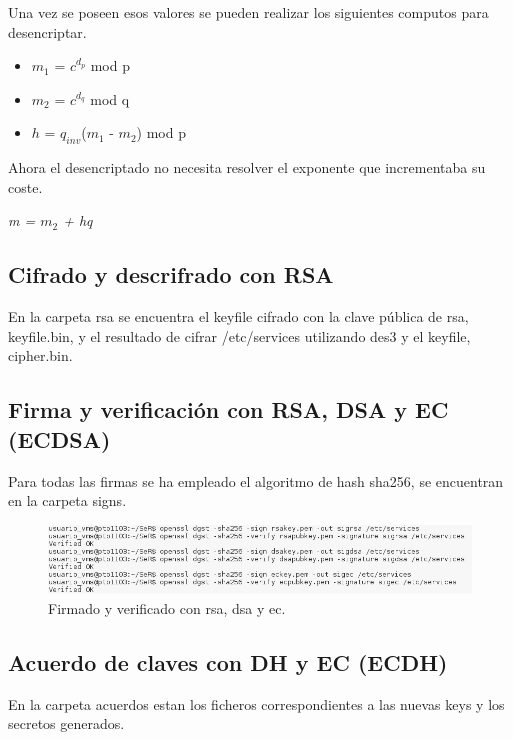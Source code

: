 \documentclass[11pt]{article}
\begin{document}
      \par
      Una vez se poseen esos valores se pueden realizar los siguientes computos para desencriptar.
      \begin{itemize}
        \item $m_1$ = $c^{d_p}$ mod p
        \item $m_2$ = $c^{d_q}$ mod q
        \item $h$ = $q_{inv}$($m_1$ - $m_2$) mod p
      \end{itemize}

      \par
      Ahora el desencriptado no necesita resolver el exponente que incrementaba su coste.
      \begin{center}
        \Large
        \textit{m = $m_2$ + hq}
      \end{center}

    \subsection{Cifrado y descrifrado con RSA}
      \par
      En la carpeta rsa se encuentra el keyfile cifrado con la clave pública de rsa, keyfile.bin,
      y el resultado de cifrar /etc/services utilizando des3 y el keyfile, cipher.bin.

    \subsection{Firma y verificación con RSA, DSA y EC (ECDSA)}
      \par
      Para todas las firmas se ha empleado el algoritmo de hash sha256, se encuentran en la carpeta
      signs.

      \FloatBarrier
      \begin{figure}[H]
        \centering
        \includegraphics[width = \textwidth]{signs}
        \caption{Firmado y verificado con rsa, dsa y ec.}
      \end{figure}

    \subsection{Acuerdo de claves con DH y EC (ECDH)} \label{ecdh}
      \par
      En la carpeta acuerdos estan los ficheros correspondientes a las nuevas keys y los secretos
      generados.
\end{document}
